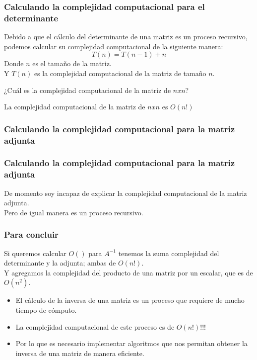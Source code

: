 \documentclass{beamer}
\begin{document}
    \begin{frame}
        \frametitle{Calculando la complejidad computacional para el determinante}
        Debido a que el cálculo del determinante de una matriz es un proceso recursivo, podemos calcular su complejidad computacional de la siguiente manera:
        $$
        T(n) = T(n-1) + n
        $$
        Donde $n$ es el tamaño de la matriz.\\
        Y $T(n)$ es la complejidad computacional de la matriz de tamaño $n$.\\
        \begin{center}
            ¿Cuál es la complejidad computacional de la matriz de $n x n$?
        \end{center}
        La complejidad computacional de la matriz de $n x n$ es $O(n!)$
    \end{frame}

    \subsubsection{Calculando la complejidad computacional para la matriz adjunta}

    \begin{frame}
        \frametitle{Calculando la complejidad computacional para la matriz adjunta}
        De momento soy incapaz de explicar la complejidad computacional de la matriz adjunta.\\
        Pero de igual manera es un proceso recursivo.\\
    \end{frame}

    \begin{frame}
        \frametitle{Para concluir}
        Si queremos calcular $O()$ para $A^{-1}$ tenemos la suma complejidad del determinante y la adjunta; ambas de $O(n!)$.\\
        Y agregamos la complejidad del producto de una matriz por un escalar, que es de $O(n^2)$.\\
        \begin{itemize}
            \item El cálculo de la inversa de una matriz es un proceso que requiere de mucho tiempo de cómputo.\\
            \item La complejidad computacional de este proceso es de $O(n!)$!!!\\
            \item Por lo que es necesario implementar algoritmos que nos permitan obtener la inversa de una matriz de manera eficiente.\\
        \end{itemize}
    \end{frame}
\end{document}

